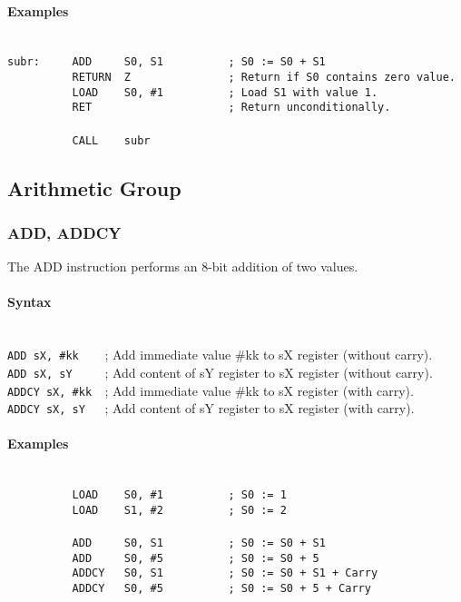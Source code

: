             \paragraph{Examples}
                ~\\
                \verb'subr:     ADD     S0, S1          ; S0 := S0 + S1'\\
                \verb'          RETURN  Z               ; Return if S0 contains zero value.'\\
                \verb'          LOAD    S0, #1          ; Load S1 with value 1.'\\
                \verb'          RET                     ; Return unconditionally.'\\
                \verb''\\
                \verb'          CALL    subr'\\

    \subsection{Arithmetic Group}
        \subsubsection{ADD, ADDCY}
            The ADD instruction performs an 8-bit addition of two values.

            \paragraph{Syntax}
                ~\\
                \verb'ADD sX, #kk    '; Add immediate value \#kk to sX register (without carry).\\
                \verb'ADD sX, sY     '; Add content of sY register to sX register (without carry).\\
                \verb'ADDCY sX, #kk  '; Add immediate value \#kk to sX register (with carry).\\
                \verb'ADDCY sX, sY   '; Add content of sY register to sX register (with carry).

            \paragraph{Examples}
                ~\\
                \verb'          LOAD    S0, #1          ; S0 := 1'\\
                \verb'          LOAD    S1, #2          ; S0 := 2'\\
                \verb''\\
                \verb'          ADD     S0, S1          ; S0 := S0 + S1'\\
                \verb'          ADD     S0, #5          ; S0 := S0 + 5'\\
                \verb'          ADDCY   S0, S1          ; S0 := S0 + S1 + Carry'\\
                \verb'          ADDCY   S0, #5          ; S0 := S0 + 5 + Carry'

